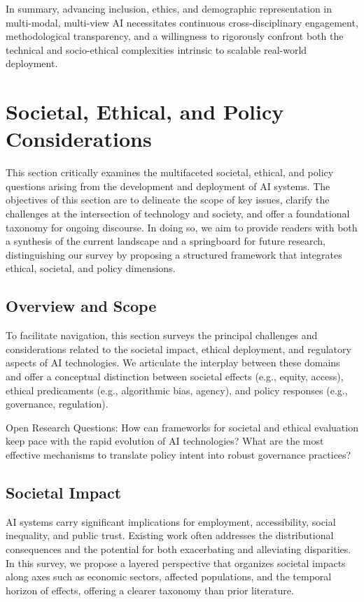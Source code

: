 \documentclass[sigconf]{acmart}
\begin{document}
In summary, advancing inclusion, ethics, and demographic representation in multi-modal, multi-view AI necessitates continuous cross-disciplinary engagement, methodological transparency, and a willingness to rigorously confront both the technical and socio-ethical complexities intrinsic to scalable real-world deployment.

\section{Societal, Ethical, and Policy Considerations}
This section critically examines the multifaceted societal, ethical, and policy questions arising from the development and deployment of AI systems. The objectives of this section are to delineate the scope of key issues, clarify the challenges at the intersection of technology and society, and offer a foundational taxonomy for ongoing discourse. In doing so, we aim to provide readers with both a synthesis of the current landscape and a springboard for future research, distinguishing our survey by proposing a structured framework that integrates ethical, societal, and policy dimensions.

\subsection{Overview and Scope}
To facilitate navigation, this section surveys the principal challenges and considerations related to the societal impact, ethical deployment, and regulatory aspects of AI technologies. We articulate the interplay between these domains and offer a conceptual distinction between societal effects (e.g., equity, access), ethical predicaments (e.g., algorithmic bias, agency), and policy responses (e.g., governance, regulation).

Open Research Questions: How can frameworks for societal and ethical evaluation keep pace with the rapid evolution of AI technologies? What are the most effective mechanisms to translate policy intent into robust governance practices?

\subsection{Societal Impact}
AI systems carry significant implications for employment, accessibility, social inequality, and public trust. Existing work often addresses the distributional consequences and the potential for both exacerbating and alleviating disparities. In this survey, we propose a layered perspective that organizes societal impacts along axes such as economic sectors, affected populations, and the temporal horizon of effects, offering a clearer taxonomy than prior literature.
\end{document}
